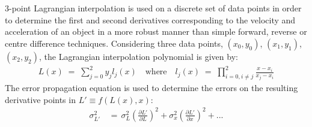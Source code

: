 \documentclass[namedreferences]{SolarPhysics}
\begin{document}
\begin{article}
3-point Lagrangian interpolation is used on a discrete set of data points in order to determine the first and second derivatives corresponding to the velocity and acceleration of an object in a more robust manner than simple forward, reverse or centre difference techniques. Considering three data points, $(x_0, y_0)$, $(x_1, y_1)$, $(x_2, y_2)$, the Lagrangian interpolation polynomial is given by:
\begin{eqnarray}
L(x) \; =\; \sum_{j=0}^2 y_j l_j(x) \quad \mbox{where} \quad
l_j(x) \; =\; \prod_{i=0, i\neq j}^2 \frac{x-x_i}{x_j-x_i} 
\end{eqnarray}
The error propagation equation is used to determine the errors on the resulting derivative points in $L' \equiv f(L(x),x)$:
\begin{eqnarray}
\sigma_{L'}^2 \,&=\, \sigma_L^2 \left(\frac{\partial L'}{\partial L}\right)^2 + \sigma_x^2\left(\frac{\partial L'}{\partial x}\right)^2+... \\

\end{eqnarray}
\end{article}
\end{document}
